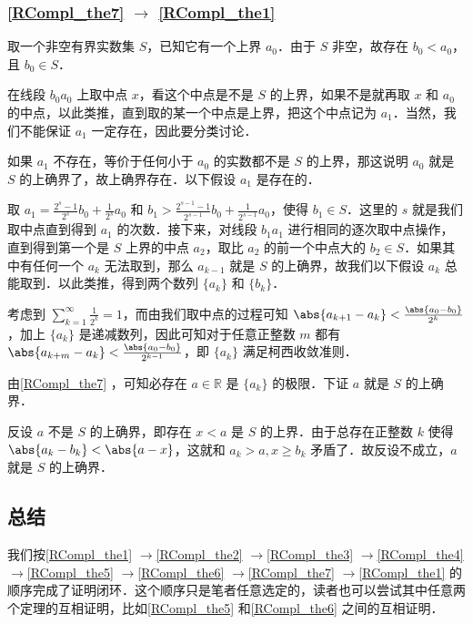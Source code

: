\subsubsection{\autoref{RCompl_the7} $\to$ \autoref{RCompl_the1} }

取一个非空有界实数集 $S$，已知它有一个上界 $a_0$．由于 $S$ 非空，故存在 $b_0<a_0$，且 $b_0\in S$．

在线段 $b_0a_0$ 上取中点 $x$，看这个中点是不是 $S$ 的上界，如果不是就再取 $x$ 和 $a_0$ 的中点，以此类推，直到取的某一个中点是上界，把这个中点记为 $a_1$．当然，我们不能保证 $a_1$ 一定存在，因此要分类讨论．

如果 $a_1$ 不存在，等价于任何小于 $a_0$ 的实数都不是 $S$ 的上界，那这说明 $a_0$ 就是 $S$ 的上确界了，故上确界存在．以下假设 $a_1$ 是存在的．


取 $a_1=\frac{2^{s}-1}{2^{s}}b_0+\frac{1}{2^{s}}a_0$ 和 $b_1>\frac{2^{{s}-1}-1}{2^{{s}-1}}b_0+\frac{1}{2^{{s}-1}}a_0$，使得 $b_1\in S$．这里的 $s$ 就是我们取中点直到得到 $a_1$ 的次数．接下来，对线段 $b_1a_1$ 进行相同的逐次取中点操作，直到得到第一个是 $S$ 上界的中点 $a_2$，取比 $a_2$ 的前一个中点大的 $b_2\in S$．如果其中有任何一个 $a_k$ 无法取到，那么 $a_{k-1}$ 就是 $S$ 的上确界，故我们以下假设 $a_k$ 总能取到．以此类推，得到两个数列 $\{a_k\}$ 和 $\{b_k\}$．

考虑到 $\sum\limits_{k=1}^\infty \frac{1}{2^k}=1$，而由我们取中点的过程可知 $\abs{a_{k+1}-a_k}<\frac{\abs{a_0-b_0}}{2^k}$，加上 $\{a_k\}$ 是递减数列，因此可知对于任意正整数 $m$ 都有 $\abs{a_{k+m}-a_k}<\frac{\abs{a_0-b_0}}{2^{k-1}}$，即 $\{a_k\}$ 满足柯西收敛准则．

由\autoref{RCompl_the7} ，可知必存在 $a\in\mathbb{R}$ 是 $\{a_k\}$ 的极限．下证 $a$ 就是 $S$ 的上确界．

反设 $a$ 不是 $S$ 的上确界，即存在 $x<a$ 是 $S$ 的上界．由于总存在正整数 $k$ 使得 $\abs{a_k-b_k}<\abs{a-x}$，这就和 $a_k>a, x\geq b_k$ 矛盾了．故反设不成立，$a$ 就是 $S$ 的上确界．

\subsection{总结}

我们按\autoref{RCompl_the1} $\to$\autoref{RCompl_the2} $\to$\autoref{RCompl_the3} $\to$\autoref{RCompl_the4} $\to$\autoref{RCompl_the5} $\to$\autoref{RCompl_the6} $\to$\autoref{RCompl_the7} $\to$\autoref{RCompl_the1} 的顺序完成了证明闭环．这个顺序只是笔者任意选定的，读者也可以尝试其中任意两个定理的互相证明，比如\autoref{RCompl_the5} 和\autoref{RCompl_the6} 之间的互相证明．

